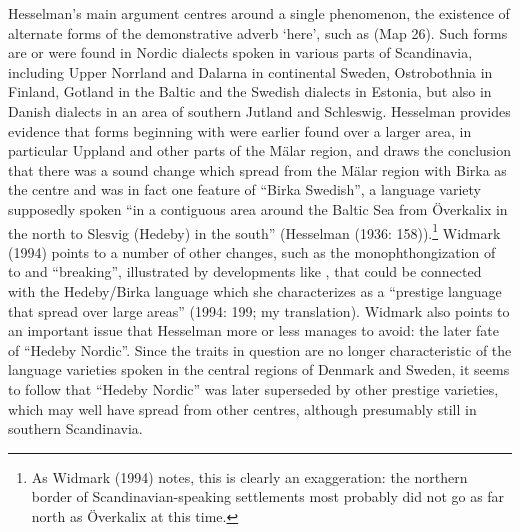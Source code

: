 Hesselman’s main argument centres around a single phenomenon, the existence of alternate forms of the demonstrative adverb  ‘here’, such as  (Map 26). Such forms are or were found in Nordic dialects spoken in various parts of Scandinavia, including Upper Norrland and Dalarna in continental Sweden, Ostrobothnia in Finland, Gotland in the Baltic and the Swedish dialects in Estonia, but also in Danish dialects in an area of southern Jutland and Schleswig. Hesselman provides evidence that forms beginning with  were earlier found over a larger area, in particular Uppland and other parts of the Mälar region, and draws the conclusion that there was a sound change  which spread from the Mälar region with Birka as the centre and was in fact one feature of “Birka Swedish”, a language variety supposedly spoken “in a contiguous area around the Baltic Sea from Överkalix in the north to Slesvig (Hedeby) in the south” (Hesselman (1936: 158)).\footnote{ As Widmark (1994) notes, this is clearly an exaggeration: the northern border of Scandinavian-speaking settlements most probably did not go as far north as Överkalix at this time.} Widmark (1994) points to a number of other changes,  such as the monophthongization of  to and “breaking”, illustrated by developments like , that could be connected with the Hedeby/Birka language which she characterizes as a “prestige language that spread over large areas” (1994: 199; my translation). Widmark also points to an important issue that Hesselman more or less manages to avoid: the later fate of “Hedeby Nordic”. Since the traits in question are no longer characteristic of the language varieties spoken in the central regions of Denmark and Sweden, it seems to follow that “Hedeby Nordic” was later superseded by other prestige varieties, which may well have spread from other centres, although presumably still in southern Scandinavia. 

\clearpage%


